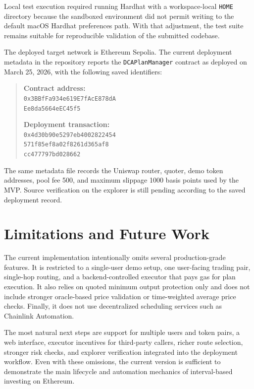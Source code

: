 \documentclass[conference]{IEEEtran}
\begin{document}
Local test execution required running Hardhat with a workspace-local \texttt{HOME} directory because the sandboxed environment did not permit writing to the default macOS Hardhat preferences path. With that adjustment, the test suite remains suitable for reproducible validation of the submitted codebase.

The deployed target network is Ethereum Sepolia. The current deployment metadata in the repository reports the \texttt{DCAPlanManager} contract as deployed on March 25, 2026, with the following saved identifiers:

\begin{quote}
\scriptsize
\textbf{Contract address:}\\
\texttt{0x3BBfFa934e619E7fAcE878dA}\\
\texttt{Ee8da5664eEC45f5}

\textbf{Deployment transaction:}\\
\texttt{0x4d30b90e5297eb4002822454}\\
\texttt{571f85ef8a02f8261d365af8}\\
\texttt{cc477797bd028662}
\end{quote}

The same metadata file records the Uniswap router, quoter, demo token addresses, pool fee 500, and maximum slippage 1000 basis points used by the MVP. Source verification on the explorer is still pending according to the saved deployment record.

\section{Limitations and Future Work}
The current implementation intentionally omits several production-grade features. It is restricted to a single-user demo setup, one user-facing trading pair, single-hop routing, and a backend-controlled executor that pays gas for plan execution. It also relies on quoted minimum output protection only and does not include stronger oracle-based price validation or time-weighted average price checks. Finally, it does not use decentralized scheduling services such as Chainlink Automation.

The most natural next steps are support for multiple users and token pairs, a web interface, executor incentives for third-party callers, richer route selection, stronger risk checks, and explorer verification integrated into the deployment workflow. Even with these omissions, the current version is sufficient to demonstrate the main lifecycle and automation mechanics of interval-based investing on Ethereum.
\end{document}
